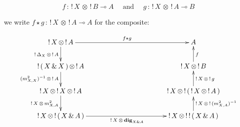 \documentclass[runningheads,a4paper]{llncs}
\newcommand{\tensor}{\otimes}
\newcommand{\laxdeux}[2]{m^2_{#1 , #2}}
\newcommand{\dig}[1]{\mathbf{dig}_{#1}}
\begin{document}
$$f\,:\,!\,X \,\tensor \,! \, B \multimap A \quad \mbox{  and  } \quad g\,:\,!\,X \,\tensor \, ! \, A \multimap B$$

\noindent
we write $f \star g\,:\,!\,X \, \otimes \, ! \, A  \multimap A$ for the composite:

$$
\makebox[10cm]{\xymatrix @R=2em{
!\,X \, \otimes \, ! \, A \ar[d]_{!\,\diag{X} \,\tensor\,!\,A} \ar[rrrr]^{f \star g} & & & & A\\
!\,(\,X \, \& \, X\,)\,\tensor\,!\,A \ar[d]_{(\laxdeux{X}{X})^{-1}\,\tensor\,!\,A} & & & & !\,X\, \tensor \, ! \, B \ar[u]_f\\
!\,X \, \tensor \, !\,X\,\tensor\,!\,A \ar[d]_{!\,X\,\tensor\,\laxdeux{X}{A}}  &&&& !\,X \, \tensor \, ! \, (\,!\,X\,\tensor\,!\,A\,) \ar[u]_{!\,X\,\tensor\,!\,g} \\
!\,X \, \tensor \, !\,(\,X\,\&\,A\,)  \ar[rrrr]_{!\,X\,\tensor\,\dig{X\& A}} &&   &&  !\,X \, \tensor \, ! \,!\,(\,X\,\&\,A\,) \ar[u]_{!\,X\,\tensor\,!\,(\laxdeux{X}{A})^{-1}} \\
}}
$$
\end{document}
